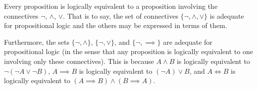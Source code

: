 \begin{node}\label{prop-000E}%
Every proposition is logically equivalent to a proposition involving the
connectives $\neg$, $\land$, $\lor$. That is to say, the set of
connectives $\{\neg,\land,\lor\}$ is adequate for propositional logic
and the others may be expressed in terms of them.

Furthermore, the sets $\{\neg,\land\}$, $\{\neg,\lor\}$, and $\{\neg,\implies\}$
are adequate for propositional logic (in the sense that any proposition
is logically equivalent to one involving only these connectives). This
is because $A\land B$ is logically equivalent to $\neg(\neg A\lor\neg B)$,
$A\implies B$ is logically equivalent to $(\neg A)\lor B$, and $A\iff B$
is logically equivalent to $(A\implies B)\land(B\implies A)$.
\end{node}

